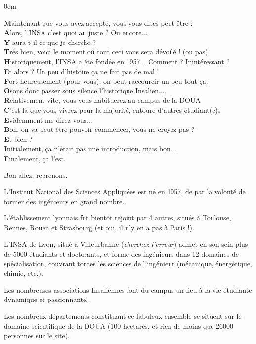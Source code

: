 {
    \footnotesize
    \parindent 0em
    \begin{changemargin}{-1cm}{0cm}
\textbf{M}aintenant que vous avez accepté, vous vous dites peut-être :\\
\textbf{A}lors, l'INSA c'est quoi au juste ? Ou encore...\\
\textbf{Y} aura-t-il ce que je cherche ?\\

\textbf{T}rès bien, voici le moment où tout ceci vous sera dévoilé ! (ou pas)\\
\textbf{H}istoriquement, l'INSA a été fondée en 1957... Comment ? Inintéressant ?\\
\textbf{E}t alors ? Un peu d'histoire ça ne fait pas de mal !\\

\textbf{F}ort heureusement (pour vous), on peut raccourcir un peu tout ça.\\
\textbf{O}sons donc passer sous silence l'historique Insalien...\\
\textbf{R}elativement vite, vous vous habituerez au campus de la DOUA\\
\textbf{C}'est là que vous vivrez pour la majorité, entouré d'autres étudiant(e)s\\
\textbf{E}videmment me direz-vous...\\

\textbf{B}on, on va peut-être pouvoir commencer, vous ne croyez pas ?\\
\textbf{E}t bien ?\\

\textbf{I}nitialement, ça n'était pas une introduction, mais bon...\\
\textbf{F}inalement, ça l'est.\\
\end{changemargin}
} %

Bon allez, reprenons.

L'Institut National des Sciences Appliquées est né en 1957, de par la volonté de
former des ingénieurs en grand nombre.

L'établissement lyonnais fut bientôt rejoint par 4 autres, situés à Toulouse, Rennes, Rouen
et Strasbourg (et oui, il n'y en a pas à Paris !).

L'INSA de Lyon, situé à Villeurbanne (\emph{cherchez l'erreur}) admet en son sein plus
de 5000 étudiants et doctorants, et forme des ingénieurs dans 12 domaines de
spécialisation, couvrant toutes les sciences de l'ingénieur (mécanique,
énergétique, chimie, etc.).

Les nombreuses associations Insaliennes font du campus un lieu à la vie
étudiante dynamique et passionnante.

Les nombreux départements constituant ce fabuleux ensemble se situent sur le
domaine scientifique de la DOUA (100 hectares, et rien de moins que 26000 personnes sur le
site).
